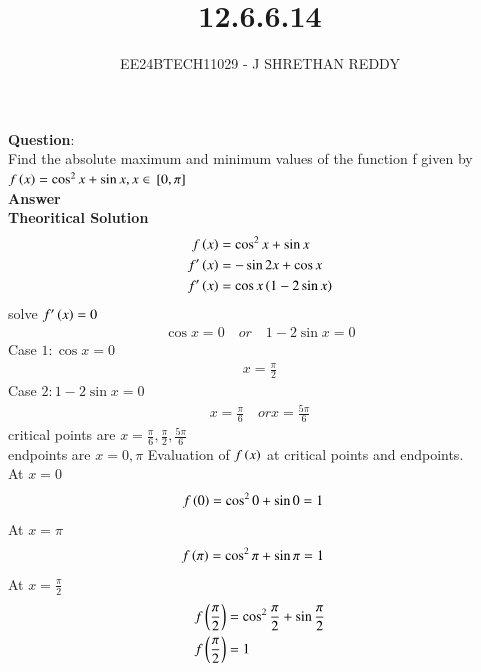 \documentclass[journal]{IEEEtran}
\begin{document}

\vspace{3cm}

\title{12.6.6.14}
\author{EE24BTECH11029 - J SHRETHAN REDDY}
\maketitle
{\let\newpage\relax\maketitle}

\renewcommand{\thefigure}{\theenumi}
\renewcommand{\thetable}{\theenumi}
\setlength{\intextsep}{10pt} %


\renewcommand{\thetable}{\theenumi}
\textbf{Question}:\\
Find the absolute maximum and minimum values of the function f given by\\
$f\left(x\right)= \cos^2 x+\sin x,x\in {}\left[0,\pi\right]$\\
\textbf{Answer}\\
\textbf{Theoritical Solution}\\
\begin{align}
    f\left(x\right)&= \cos^2 x+\sin x\\
    f^\prime\left(x\right)&=-\sin{2x}+\cos{x}\\
    f^\prime\left(x\right)&=\cos{x}\left(1-2\sin{x}\right)
\end{align}
solve $f^\prime\left(x\right)=0$\\
\begin{align}
    \cos{x}=0 \quad or \quad 1-2\sin{x}=0
\end{align}
Case $1\colon\cos{x}=0$
\begin{align}
    x=\frac{\pi}{2}
\end{align}
Case $2\colon1-2\sin{x}=0$
\begin{align}
    x=\frac{\pi}{6} \quad or x=\frac{5\pi}{6}
\end{align}
critical points are $x=\frac{\pi}{6},\frac{\pi}{2},\frac{5\pi}{6}$\\
endpoints are $x=0,\pi$
Evaluation of $f\left(x\right)$ at critical points and endpoints.\\
At $x=0$
\begin{align}
    f\left(0\right)&=\cos^2{0}+\sin{0}=1
\end{align}
At $x=\pi$
\begin{align}
    f\left(\pi\right)&=\cos^2{\pi}+\sin{\pi}=1
\end{align}
At $x=\frac{\pi}{2}$\\
\begin{align}
    f\left(\frac{\pi}{2}\right)&=\cos^2{\frac{\pi}{2}}+\sin{\frac{\pi}{2}}\\
    f\left(\frac{\pi}{2}\right)&=1
\end{align}
\end{document}
